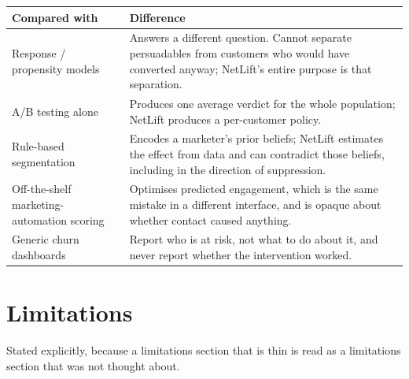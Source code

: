 \documentclass[11pt,a4paper]{article}
\begin{document}
\begin{tabularx}{\textwidth}{@{}L{4.4cm}X@{}}
\toprule
\textbf{Compared with} & \textbf{Difference} \\
\midrule
Response / propensity models & Answers a different question. Cannot separate persuadables from
customers who would have converted anyway; NetLift's entire purpose is that separation. \\
A/B testing alone & Produces one average verdict for the whole population; NetLift produces a
per-customer policy. \\
Rule-based segmentation & Encodes a marketer's prior beliefs; NetLift estimates the effect from
data and can contradict those beliefs, including in the direction of suppression. \\
Off-the-shelf marketing-automation scoring & Optimises predicted engagement, which is the same
mistake in a different interface, and is opaque about whether contact caused anything. \\
Generic churn dashboards & Report who is at risk, not what to do about it, and never report whether
the intervention worked. \\
\bottomrule
\end{tabularx}

\section{Limitations}
\label{sec:limitations-anchor}

Stated explicitly, because a limitations section that is thin is read as a limitations section that
was not thought about.
\end{document}
